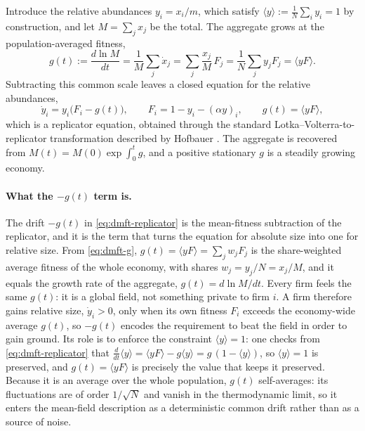 Introduce the relative abundances $y_i = x_i/m$, which satisfy $\langle y\rangle :=
\frac1N\sum_i y_i = 1$ by construction, and let $M = \sum_j x_j$ be the total. The
aggregate grows at the population-averaged fitness,
\begin{equation}
    g(t) := \frac{d\ln M}{dt}
          = \frac1M\sum_j \dot x_j = \sum_j \frac{x_j}{M}\,F_j
          = \frac1N\sum_j y_j F_j = \langle yF\rangle .
    \label{eq:dmft-g}
\end{equation}
Subtracting this common scale leaves a closed equation for the relative abundances,
\begin{equation}
    \dot y_i = y_i\big(F_i - g(t)\big),\qquad
    F_i = 1 - y_i - (\alpha y)_i,\qquad
    g(t) = \langle yF\rangle ,
    \label{eq:dmft-replicator}
\end{equation}
which is a replicator equation, obtained through the standard Lotka--Volterra-to-replicator
transformation described by Hofbauer \citep{hofbauer81}. The aggregate is recovered from
$M(t) = M(0)\exp\!\int_0^t g$, and a positive stationary $g$ is a steadily growing
economy.

\paragraph{What the $-g(t)$ term is.}
The drift $-g(t)$ in \eqref{eq:dmft-replicator} is the mean-fitness subtraction of the
replicator, and it is the term that turns the equation for absolute size into one for
relative size. From \eqref{eq:dmft-g}, $g(t) = \langle yF\rangle = \sum_j w_j F_j$ is the
share-weighted average fitness of the whole economy, with shares $w_j = y_j/N = x_j/M$,
and it equals the growth rate of the aggregate, $g(t) = d\ln M/dt$. Every firm feels the
same $g(t)$: it is a global field, not something private to firm $i$. A firm therefore
gains relative size, $\dot y_i > 0$, only when its own fitness $F_i$ exceeds the
economy-wide average $g(t)$, so $-g(t)$ encodes the requirement to beat the field in
order to gain ground. Its role is to enforce the constraint $\langle y\rangle = 1$: one
checks from \eqref{eq:dmft-replicator} that $\frac{d}{dt}\langle y\rangle = \langle
yF\rangle - g\langle y\rangle = g\,(1 - \langle y\rangle)$, so $\langle y\rangle = 1$ is
preserved, and $g(t) = \langle yF\rangle$ is precisely the value that keeps it preserved.
Because it is an average over the whole population, $g(t)$ self-averages: its fluctuations
are of order $1/\sqrt N$ and vanish in the thermodynamic limit, so it enters the mean-field
description as a deterministic common drift rather than as a source of noise.

